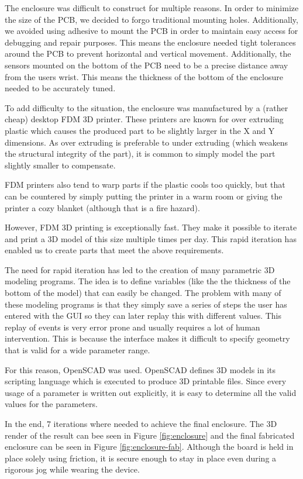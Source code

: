 
The enclosure was difficult to construct for multiple reasons.  In order to
minimize the size of the PCB, we decided to forgo traditional mounting holes.
Additionally, we avoided using adhesive to mount the PCB in order to maintain
easy access for debugging and repair purposes.  This means the enclosure needed
tight tolerances around the PCB to prevent horizontal and vertical movement.
Additionally, the sensors mounted on the bottom of the PCB need to be a precise
distance away from the users wrist.  This means the thickness of the bottom of
the enclosure needed to be accurately tuned.

To add difficulty to the situation, the enclosure was manufactured by a (rather
cheap) desktop FDM 3D printer.  These printers are known for over extruding
plastic which causes the produced part to be slightly larger in the X and Y
dimensions.  As over extruding is preferable to under extruding (which weakens
the structural integrity of the part), it is common to simply model the part
slightly smaller to compensate.

FDM printers also tend to warp parts if the plastic cools too quickly, but that
can be countered by simply putting the printer in a warm room or giving the
printer a cozy blanket (although that is a fire hazard).

However, FDM 3D printing is exceptionally fast.  They make it possible to
iterate and print a 3D model of this size multiple times per day.  This rapid
iteration has enabled us to create parts that meet the above requirements.

The need for rapid iteration has led to the creation of many parametric 3D
modeling programs.  The idea is to define variables (like the the thickness of
the bottom of the model) that can easily be changed.  The problem with many of
these modeling programs is that they simply save a series of steps the user has
entered with the GUI so they can later replay this with different values.  This
replay of events is very error prone and usually requires a lot of human
intervention.  This is because the interface makes it difficult to specify
geometry that is valid for a wide parameter range.

For this reason, OpenSCAD was used.  OpenSCAD defines 3D models in its
scripting language which is executed to produce 3D printable files.  Since
every usage of a parameter is written out explicitly, it is easy to determine
all the valid values for the parameters.

In the end, 7 iterations where needed to achieve the final enclosure. The 3D
render of the result can bee seen in Figure \ref{fig:enclosure} and the final
fabricated enclosure can be seen in Figure \ref{fig:enclosure-fab}.  Although
the board is held in place solely using friction, it is secure enough to stay in
place even during a rigorous jog while wearing the device.

